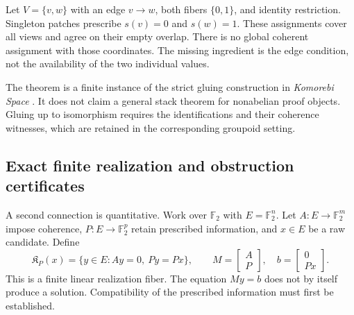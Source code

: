 \begin{PPTexample}
\label{PPT:res:23:3}
Let $V=\{v,w\}$ with an edge $v\to w$, both fibers $\{0,1\}$, and identity restriction. Singleton patches prescribe $s(v)=0$ and $s(w)=1$. These assignments cover all views and agree on their empty overlap. There is no global coherent assignment with those coordinates. The missing ingredient is the edge condition, not the availability of the two individual values.
\end{PPTexample}

The theorem is a finite instance of the strict gluing construction in \emph{Komorebi Space} \cite{PPT:komorebi-space}. It does not claim a general stack theorem for nonabelian proof objects. Gluing up to isomorphism requires the identifications and their coherence witnesses, which are retained in the corresponding groupoid setting.

\subsection{Exact finite realization and obstruction certificates}

A second connection is quantitative. Work over $\mathbb F_2$ with $E=\mathbb F_2^n$. Let $A:E\to\mathbb F_2^m$ impose coherence, $P:E\to\mathbb F_2^p$ retain prescribed information, and $x\in E$ be a raw candidate. Define
\[
\mathfrak K_P(x)=\{y\in E:Ay=0,\ Py=Px\},\qquad
M=\begin{bmatrix}A\\P\end{bmatrix},\quad
b=\begin{bmatrix}0\\Px\end{bmatrix}.
\]
This is a finite linear realization fiber. The equation $My=b$ does not by itself produce a solution. Compatibility of the prescribed information must first be established.

